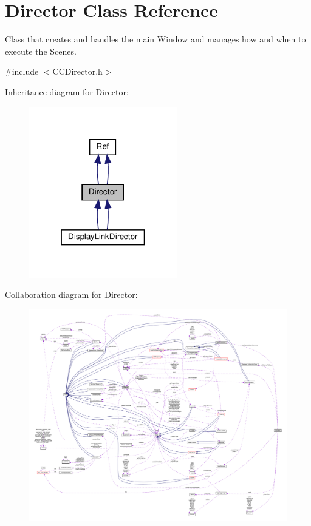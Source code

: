 \hypertarget{classDirector}{}\section{Director Class Reference}
\label{classDirector}


Class that creates and handles the main Window and manages how and when to execute the Scenes.  




{\ttfamily \#include $<$C\+C\+Director.\+h$>$}



Inheritance diagram for Director\+:
\nopagebreak
\begin{figure}[H]
\begin{center}
\leavevmode
\includegraphics[width=182pt]{classDirector__inherit__graph}
\end{center}
\end{figure}


Collaboration diagram for Director\+:
\nopagebreak
\begin{figure}[H]
\begin{center}
\leavevmode
\includegraphics[width=350pt]{classDirector__coll__graph}
\end{center}
\end{figure}
